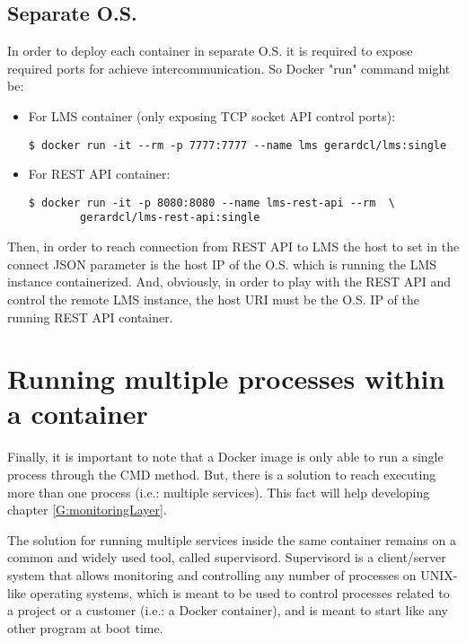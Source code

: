 \subsection{Separate O.S.}

In order to deploy each container in separate O.S. it is required to expose required ports for achieve intercommunication. So Docker "run" command might be:
\begin{itemize}
\item For LMS container (only exposing TCP socket API control ports): \hfill

\begin{verbatim}
$ docker run -it --rm -p 7777:7777 --name lms gerardcl/lms:single
\end{verbatim}
\item For REST API container: \hfill

\begin{verbatim}
$ docker run -it -p 8080:8080 --name lms-rest-api --rm  \
		gerardcl/lms-rest-api:single
\end{verbatim}
\end{itemize}

Then, in order to reach connection from REST API to LMS the host to set in the connect JSON parameter is the host IP of the O.S. which is running the LMS instance containerized. And, obviously, in order to play with the REST API and control the remote LMS instance, the host URI must be the O.S. IP of the running REST API container.

\section{Running multiple processes within a container}

Finally, it is important to note that a Docker image is only able to run a single process through the CMD method. But, there is a solution to reach executing more than one process (i.e.: multiple services). This fact will help developing chapter \ref{G:monitoringLayer}.

The solution for running multiple services inside the same container remains on a common and widely used tool, called supervisord. Supervisord is a client/server system that allows monitoring and controlling any number of processes on UNIX-like operating systems, which is meant to be used to control processes related to a project or a customer (i.e.: a Docker container), and is meant to start like any other program at boot time.

